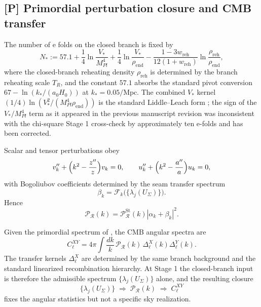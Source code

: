 \subsection{[P] Primordial perturbation closure and CMB transfer}

\begin{conjecture}
\label{thm:reheating_fixed_efolds}
The number of e folds on the closed branch is fixed by
\[
N_*
:=
57.1
+\frac14\ln\frac{V_*}{M_{Pl}^4}
+\frac14\ln\frac{V_*}{\rho_{\mathrm{end}}}
-\frac{1-3w_{\mathrm{reh}}}{12(1+w_{\mathrm{reh}})}
\ln\frac{\rho_{\mathrm{reh}}}{\rho_{\mathrm{end}}},
\]
where the closed-branch reheating density $\rho_{\mathrm{reh}}$ is determined by the branch
reheating scale $T_R$, and the constant $57.1$ absorbs the standard pivot conversion
$67-\ln(k_*/(a_0H_0))$ at $k_*=0.05/\mathrm{Mpc}$. The combined $V_*$ kernel
$(1/4)\ln(V_*^2/(M_{Pl}^4\rho_{\mathrm{end}}))$ is the standard Liddle--Leach form
\cite{LiddleLeach2003}; the sign of the $V_*/M_{Pl}^4$ term as it appeared in the previous
manuscript revision was inconsistent with the chi-square Stage 1 cross-check by approximately ten
e-folds and has been corrected.
\end{conjecture}

\begin{conjecture}
\label{thm:primordial_mode_closure_seam_state}
Scalar and tensor perturbations obey
\[
v_k''+\Bigl(k^2-\frac{z''}{z}\Bigr)v_k=0,
\qquad
u_k''+\Bigl(k^2-\frac{a''}{a}\Bigr)u_k=0,
\]
with Bogoliubov coefficients determined by the seam transfer spectrum
\[
\beta_k=\mathcal F_k\bigl(\{\lambda_j(U_\Sigma)\}\bigr).
\]
Hence
\[
\mathcal P_{\mathcal R}(k)=\mathcal P_{\mathcal R}^{\mathrm{St}}(k)|\alpha_k+\beta_k|^2.
\]
\end{conjecture}

\begin{conjecture}
\label{thm:cmb_transfer_closure_closed_branch}
Given the primordial spectrum of
, the CMB angular spectra are
\[
C_\ell^{XY}=4\pi\int \frac{dk}{k}\,\mathcal P_{\mathcal R}(k)\,\Delta_\ell^X(k)\Delta_\ell^Y(k).
\]
The transfer kernels \(\Delta_\ell^X\) are determined by the same branch background and the
standard linearized recombination hierarchy. At Stage 1 the closed-branch input is therefore the
admissible spectrum $\{\lambda_j(U_\Sigma)\}$ alone, and the resulting closure
\[
\{\lambda_j(U_\Sigma)\}\;\Longrightarrow\;\mathcal P_{\mathcal R}(k)\;\Longrightarrow\;C_\ell^{XY}
\]
fixes the angular statistics but not a specific sky realization.
\end{conjecture}

